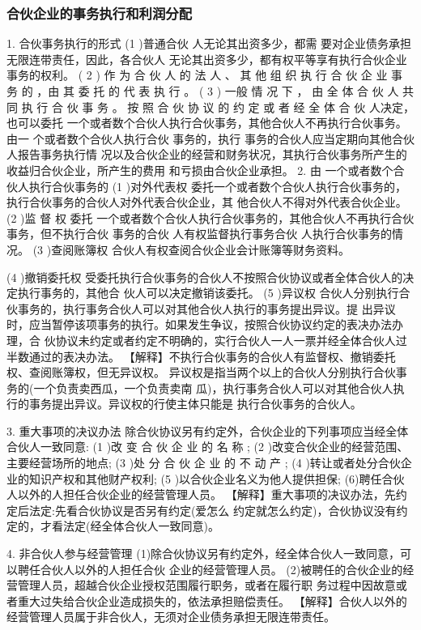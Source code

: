 \documentclass[UTF8,12pt]{ctexart}
\numberwithin{equation}{section} %
\numberwithin{figure}{section}
\numberwithin{table}{section}
\begin{document}
	\subsubsection{合伙企业的事务执行和利润分配}
	1. 合伙事务执行的形式
	(1 )普通合伙 人无论其出资多少，都需 要对企业债务承担无限连带责任，因此，各合伙人 无论其出资多少，都有权平等享有执行合伙企业事务的权利。
	( 2 ) 作 为 合 伙 人 的 法 人 、 其 他 组 织 执 行 合 伙 企 业 事 务 的 ，由 其 委 托 的 代 表 执 行 。
	( 3 ) 一般 情 况 下 ， 由 全 体 合 伙 人 共 同 执 行 合 伙 事 务 。 按 照 合 伙 协 议 的 约 定 或 者 经 全 体 合 伙 人决定，也可以委托 一个或者数个合伙人执行合伙事务，其他合伙人不再执行合伙事务。由一 个或者数个合伙人执行合伙 事务的，执行 事务的合伙人应当定期向其他合伙人报告事务执行情 况以及合伙企业的经营和财务状况，其执行合伙事务所产生的收益归合伙企业，所产生的费用 和亏损由合伙企业承担。
	2. 由 一个或者数个合伙人执行合伙事务的
	(1 )对外代表权 委托一个或者数个合伙人执行合伙事务的，执行合伙事务的合伙人对外代表合伙企业，其 他合伙人不得对外代表合伙企业。
	(2 )监 督 权
	委托 一个或者数个合伙人执行合伙事务的，其他合伙人不再执行合伙事务，但不执行合伙 事务的合伙 人有权监督执行事务合伙 人执行合伙事务的情况。
	(3 )查阅账簿权
	合伙人有权查阅合伙企业会计账簿等财务资料。
	
	(4 )撤销委托权
	受委托执行合伙事务的合伙人不按照合伙协议或者全体合伙人的决定执行事务的，其他合 伙人可以决定撤销该委托。
	(5 )异议权 合伙人分别执行合伙事务的，执行事务合伙人可以对其他合伙人执行的事务提出异议。提 出异议时，应当暂停该项事务的执行。如果发生争议，按照合伙协议约定的表决办法办理，合 伙协议未约定或者约定不明确的，实行合伙人一人一票并经全体合伙人过半数通过的表决办法。
	【解释】不执行合伙事务的合伙人有监督权、撤销委托权、查阅账簿权，但无异议权。 异议权是指当两个以上的合伙人分别执行合伙事务的(一个负责卖西瓜，一个负责卖南 瓜)，执行事务合伙人可以对其他合伙人执行的事务提出异议。异议权的行使主体只能是 执行合伙事务的合伙人。
	
	3. 重大事项的决议办法 除合伙协议另有约定外，合伙企业的下列事项应当经全体合伙人一致同意: (1 )改 变 合 伙 企 业 的 名 称 ;
	(2 )改变合伙企业的经营范围、主要经营场所的地点;
	(3 )处 分 合 伙 企 业 的 不 动 产 ;
	(4 )转让或者处分合伙企业的知识产权和其他财产权利; (5 )以合伙企业名义为他人提供担保; (6)聘任合伙人以外的人担任合伙企业的经营管理人员。
	【解释】重大事项的决议办法，先约定后法定:先看合伙协议是否另有约定(爱怎么 约定就怎么约定)，合伙协议没有约定的，才看法定(经全体合伙人一致同意)。
	
	4. 非合伙人参与经营管理 (1)除合伙协议另有约定外，经全体合伙人一致同意，可以聘任合伙人以外的人担任合伙 企业的经营管理人员。 (2)被聘任的合伙企业的经营管理人员，超越合伙企业授权范围履行职务，或者在履行职 务过程中因故意或者重大过失给合伙企业造成损失的，依法承担赔偿责任。 【解释】合伙人以外的经营管理人员属于非合伙人，无须对企业债务承担无限连带责任。
	
\end{document}
